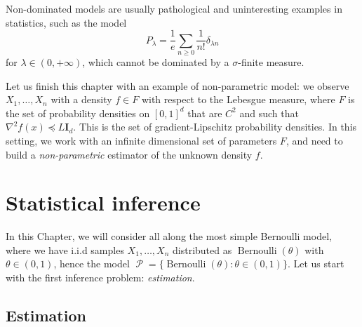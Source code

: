 \documentclass[
	fontsize=11pt, %
	twoside=false, %
	numbers=noenddot, %
]{kaobook}
\DeclareMathOperator{\cP}{\mathcal P}
\DeclareMathOperator{\ber}{Bernoulli}
\newcommand{\grad}{\nabla}
\newcommand{\mleq}{\preccurlyeq}
\begin{document}
Non-dominated models are usually pathological and uninteresting examples in statistics, such as the model
\begin{equation*}
	P_\lambda = \frac 1e \sum_{n \geq 0} \frac{1}{n!} \delta_{\lambda n}
\end{equation*}
for $\lambda \in (0, +\infty)$, which cannot be dominated by a $\sigma$-finite measure.

Let us finish this chapter with an example of non-parametric model: we observe $X_1, \ldots, X_n$ with a density $f \in F$ with respect to the Lebesgue measure, where $F$ is the set of probability densities on $[0, 1]^d$ that are $C^2$ and such that $\grad^2 f(x) \mleq L \mathbf I_d$. This is the set of gradient-Lipschitz probability densities.
In this setting, we work with an infinite dimensional set of parameters $F$, and need to build a \emph{non-parametric} estimator of the unknown density $f$.


\setchapterpreamble[u]{\margintoc}
\chapter{Statistical inference}
\label{chap:statistical_inference}

In this Chapter, we will consider all along the most simple Bernoulli model, where we have i.i.d samples $X_1, \ldots, X_n$ distributed as $\ber(\theta)$ with $\theta \in (0, 1)$, hence the model $\cP = \{ \ber(\theta) : \theta \in (0, 1) \}$.
Let us start with the first inference problem: \emph{estimation}.

\section{Estimation} %
\label{sec:estimation}
\end{document}
